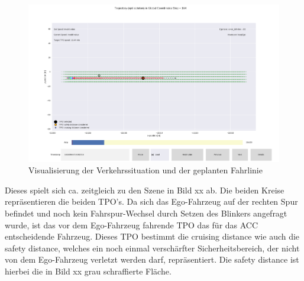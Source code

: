 \begin{figure}[!ht]
	\begin{center}
	\includegraphics[width=1.0\linewidth]{Abbildungen/bericht/process_logged_data_lc_part1}
	\caption{Visualisierung der Verkehrssituation und der geplanten Fahrlinie}
	\label{fig.process_logged_data_part1}
\end{center}
\end{figure} 

Dieses spielt sich ca. zeitgleich zu den Szene in Bild xx ab. Die beiden Kreise repräsentieren die beiden TPO's. Da sich das Ego-Fahrzeug auf der rechten Spur befindet und noch kein Fahrspur-Wechsel durch Setzen des Blinkers angefragt wurde, ist das vor dem Ego-Fahrzeug fahrende TPO das für das ACC entscheidende Fahrzeug. Dieses TPO bestimmt die \glqq cruising distance\grqq{} wie auch die \glqq safety distance\grqq{}, welches ein noch einmal verschärfter Sicherheitsbereich, der nicht von dem Ego-Fahrzeug verletzt werden darf, repräsentiert. Die \grqq safety distance\grqq{} ist hierbei die in Bild xx grau schraffierte Fläche.
